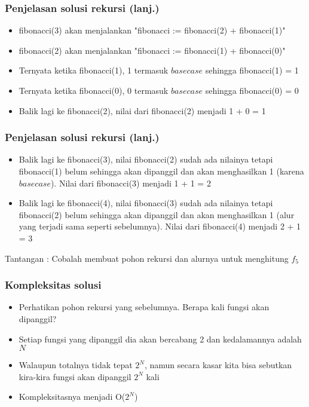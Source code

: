 \begin{frame}
\frametitle{Penjelasan solusi rekursi (lanj.)}
\begin {itemize}
  \item fibonacci(3) akan menjalankan "fibonacci := fibonacci(2) + fibonacci(1)"
  \item fibonacci(2) akan menjalankan "fibonacci := fibonacci(1) + fibonacci(0)"
  \item Ternyata ketika fibonacci(1), 1 termasuk $base case$ sehingga fibonacci(1) = 1
  \item Ternyata ketika fibonacci(0), 0 termasuk $base case$ sehingga fibonacci(0) = 0
  \item Balik lagi ke fibonacci(2), nilai dari fibonacci(2) menjadi 1 + 0 = 1
\end{itemize}
\end{frame}

\begin{frame}
\frametitle{Penjelasan solusi rekursi (lanj.)}
\begin {itemize}
  \item Balik lagi ke fibonacci(3), nilai fibonacci(2) sudah ada nilainya tetapi fibonacci(1) belum sehingga akan dipanggil dan akan menghasilkan 1 (karena $base case$). Nilai dari fibonacci(3) menjadi 1 + 1 = 2
  \item Balik lagi ke fibonacci(4), nilai fibonacci(3) sudah ada nilainya tetapi fibonacci(2) belum sehingga akan dipanggil dan akan menghasilkan 1 (alur yang terjadi sama seperti sebelumnya). Nilai dari fibonacci(4) menjadi 2 + 1 = 3
\end{itemize}
Tantangan : Cobalah membuat pohon rekursi dan alurnya untuk menghitung $f_5$
\end{frame}

\begin{frame}
\frametitle{Kompleksitas solusi}
\begin {itemize}
   \item Perhatikan pohon rekursi yang sebelumnya. Berapa kali fungsi akan dipanggil?
   \item Setiap fungsi yang dipanggil dia akan bercabang 2 dan kedalamannya adalah $N$
   \item Walaupun totalnya tidak tepat $2^{N}$, namun secara kasar kita bisa sebutkan kira-kira fungsi akan dipanggil $2^{N}$ kali
   \item Kompleksitasnya menjadi O($2^{N}$)
\end {itemize}
\end{frame}

